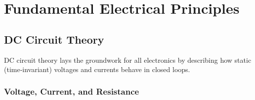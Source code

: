 \documentclass[11pt]{article}
\begin{document}
\section{Fundamental Electrical Principles} \label{sec:fundamentals}
\subsection{DC Circuit Theory} \label{subsec:dc_circuit_theory}
DC circuit theory lays the groundwork for all electronics by
describing how static (time‑invariant) voltages and currents behave
in closed loops.\par
\begin{figure}[!h]
  \centering
\end{figure}

\subsubsection{Voltage, Current, and Resistance}
\end{document}
